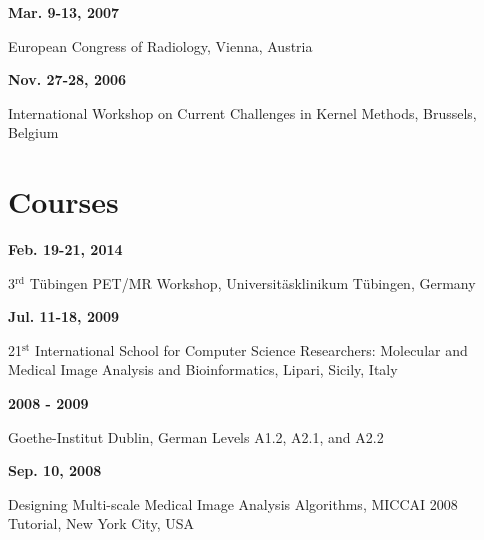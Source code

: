 \documentclass[line,a4paper]{resume}
\newcommand{\superscript}[1]{\ensuremath{^{\text{#1}}}}
\begin{document}
\begin{resume}
\noindent
\begin{minipage}[t]{0.20\linewidth}
\textbf{Mar. 9-13, 2007}
\end{minipage}
\begin{minipage}[t]{0.80\linewidth}\raggedright
European Congress of Radiology, Vienna, Austria
\end{minipage}

\noindent
\begin{minipage}[t]{0.20\linewidth}
\textbf{Nov. 27-28, 2006}
\end{minipage}
\begin{minipage}[t]{0.80\linewidth}\raggedright
International Workshop on Current Challenges in Kernel Methods, Brussels, Belgium
\end{minipage}

\section{\mysidestyle Courses}\vspace{3mm}
\begin{minipage}[t]{0.20\linewidth}
\textbf{Feb. 19-21, 2014}
\end{minipage}
\begin{minipage}[t]{0.80\linewidth}\raggedright
3\superscript{rd} T{\"u}bingen PET/MR Workshop, Universit{\"a}sklinikum T{\"u}bingen, Germany
\end{minipage}

\begin{minipage}[t]{0.20\linewidth}
\textbf{Jul. 11-18, 2009}
\end{minipage}
\begin{minipage}[t]{0.80\linewidth}\raggedright
21\superscript{st} International School for Computer Science Researchers: Molecular and Medical Image Analysis and Bioinformatics, Lipari, Sicily, Italy
\end{minipage}

\noindent
\begin{minipage}[t]{0.20\linewidth}
\textbf{2008 - 2009}
\end{minipage}
\begin{minipage}[t]{0.80\linewidth}\raggedright
Goethe-Institut Dublin, German Levels A1.2, A2.1, and A2.2
\end{minipage}

\noindent
\begin{minipage}[t]{0.20\linewidth}
\textbf{Sep. 10, 2008}
\end{minipage}
\begin{minipage}[t]{0.80\linewidth}\raggedright
Designing Multi-scale Medical Image Analysis Algorithms, MICCAI 2008 Tutorial, New York City, USA
\end{minipage}


\end{resume}
\end{document}
